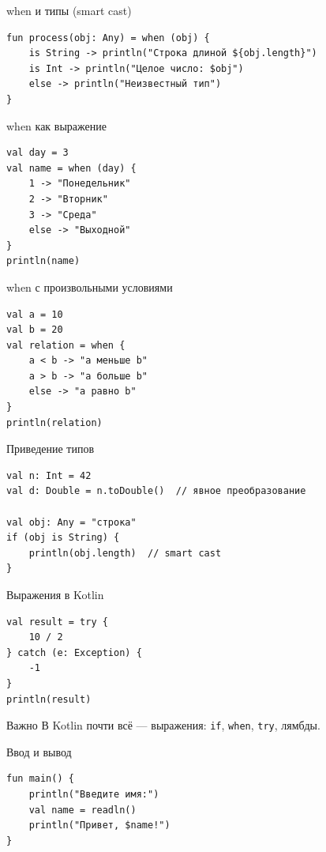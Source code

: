 \documentclass[aspectratio=169]{beamer}
\begin{document}
\begin{frame}[fragile]{when и типы (smart cast)}
\lstset{language=Kotlin}
\begin{lstlisting}
fun process(obj: Any) = when (obj) {
    is String -> println("Строка длиной ${obj.length}")
    is Int -> println("Целое число: $obj")
    else -> println("Неизвестный тип")
}
\end{lstlisting}
\end{frame}

\begin{frame}[fragile]{when как выражение}
\lstset{language=Kotlin}
\begin{lstlisting}
val day = 3
val name = when (day) {
    1 -> "Понедельник"
    2 -> "Вторник"
    3 -> "Среда"
    else -> "Выходной"
}
println(name)
\end{lstlisting}
\end{frame}

\begin{frame}[fragile]{when с произвольными условиями}
\lstset{language=Kotlin}
\begin{lstlisting}
val a = 10
val b = 20
val relation = when {
    a < b -> "a меньше b"
    a > b -> "a больше b"
    else -> "a равно b"
}
println(relation)
\end{lstlisting}
\end{frame}

\begin{frame}[fragile]{Приведение типов}
\lstset{language=Kotlin}
\begin{lstlisting}
val n: Int = 42
val d: Double = n.toDouble()  // явное преобразование

val obj: Any = "строка"
if (obj is String) {
    println(obj.length)  // smart cast
}
\end{lstlisting}
\end{frame}

\begin{frame}[fragile]{Выражения в Kotlin}
\lstset{language=Kotlin}
\begin{lstlisting}
val result = try {
    10 / 2
} catch (e: Exception) {
    -1
}
println(result)
\end{lstlisting}
\begin{block}{Важно}
В Kotlin почти всё — выражения: \texttt{if}, \texttt{when}, \texttt{try}, лямбды.
\end{block}
\end{frame}

\begin{frame}[fragile]{Ввод и вывод}
\lstset{language=Kotlin}
\begin{lstlisting}
fun main() {
    println("Введите имя:")
    val name = readln()
    println("Привет, $name!")
}
\end{lstlisting}
\end{frame}
\end{document}
